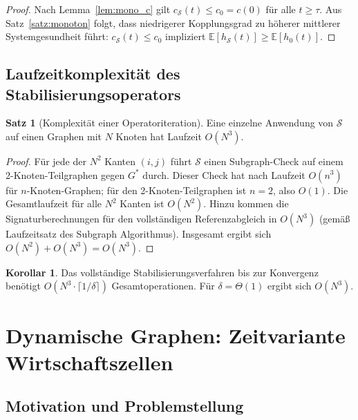 ﻿\documentclass[a4paper,12pt]{article}
\theoremstyle{definition}
\newtheorem{satz}{Satz}
\newtheorem{korollar}{Korollar}
\begin{document}
\begin{proof}
    Nach Lemma~\ref{lem:mono_c} gilt $c_{\mathcal{S}}(t) \leq c_0 = c(0)$ für alle
    $t \geq \tau$. Aus Satz~\ref{satz:monoton} folgt, dass niedrigerer Kopplungsgrad
    zu höherer mittlerer Systemgesundheit führt: $c_{\mathcal{S}}(t) \leq c_0$ impliziert
    $\mathbb{E}[h_{\mathcal{S}}(t)] \geq \mathbb{E}[h_0(t)]$.
\end{proof}

\subsection{Laufzeitkomplexität des Stabilisierungsoperators}

\begin{satz}[Komplexität einer Operatoriteration]
\label{satz:komplex_op}
    Eine einzelne Anwendung von $\mathcal{S}$ auf einen Graphen mit $N$ Knoten hat
    Laufzeit $O(N^3)$.
\end{satz}

\begin{proof}
    Für jede der $N^2$ Kanten $(i,j)$ führt $\mathcal{S}$ einen Subgraph-Check
    auf einem 2-Knoten-Teilgraphen gegen $G^*$ durch. Dieser Check hat nach
    \citep{epp2026subgraph} Laufzeit $O(n^3)$ für $n$-Knoten-Graphen; für
    den 2-Knoten-Teilgraphen ist $n=2$, also $O(1)$. Die Gesamtlaufzeit für
    alle $N^2$ Kanten ist $O(N^2)$. Hinzu kommen die Signaturberechnungen
    für den vollständigen Referenzabgleich in $O(N^3)$ (gemäß Laufzeitsatz des
    Subgraph Algorithmus). Insgesamt ergibt sich $O(N^2) + O(N^3) = O(N^3)$.
\end{proof}

\begin{korollar}
    Das vollständige Stabilisierungsverfahren bis zur Konvergenz benötigt
    $O(N^3 \cdot \lceil 1/\delta \rceil)$ Gesamtoperationen. Für $\delta = \Theta(1)$
    ergibt sich $O(N^3)$.
\end{korollar}

\section{Dynamische Graphen: Zeitvariante Wirtschaftszellen}
\label{sec:dynGraph}

\subsection{Motivation und Problemstellung}
\end{document}
